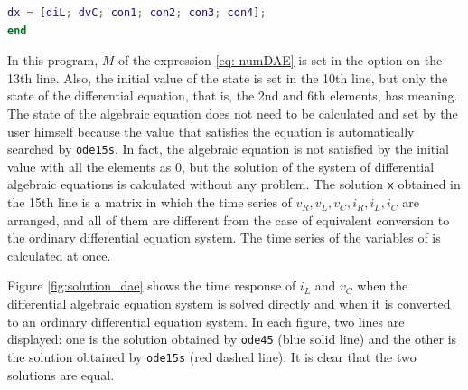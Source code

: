 \documentclass[graybox, envcountchap]{svmult}
\begin{document}
\begin{example}
\begin{lstlisting}[language=Matlab, caption=main\_RLC\_dae.m, label={program:DAE1}]
  dx = [diL; dvC; con1; con2; con3; con4];
end
\end{lstlisting}

In this program, $M$ of the expression \ref{eq: numDAE} is set in the option on
the 13th line. Also, the initial value of the state is set in the 10th line,
but only the state of the differential equation, that is, the 2nd and 6th
elements, has meaning. The state of the algebraic equation does not need to be
calculated and set by the user himself because the value that satisfies the
equation is automatically searched by \verb|ode15s|. In fact, the algebraic
equation is not satisfied by the initial value with all the elements as $0$, but
the solution of the system of differential algebraic equations is calculated
without any problem. The solution \verb|x| obtained in the 15th line is a
matrix in which the time series of $v_R, v_L, v_C, i_R, i_L, i_C$ are arranged,
and all of them are different from the case of equivalent conversion to the
ordinary differential equation system. The time series of the variables of is
calculated at once.

Figure \ref{fig:solution_dae} shows the time response of $i_L$ and $v_C$ when
the differential algebraic equation system is solved directly and when it is
converted to an ordinary differential equation system.  In each figure, two
lines are displayed: one is the solution obtained by \verb|ode45| (blue solid
line) and the other is the solution obtained by \verb|ode15s| (red dashed line).
It is clear that the two solutions are equal.


\end{example}
\end{document}
